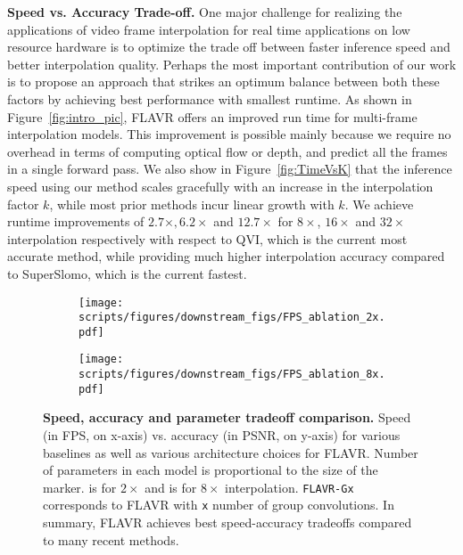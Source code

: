 \documentclass[10pt,twocolumn,letterpaper]{article}
\newcommand{\figref}[1]{Figure~\ref{#1}}
\newcommand{\red}[1]{{#1}}
\newcommand{\Ours}{FLAVR}
\newcommand{\twox}{$2\times$}
\newcommand{\eightx}{$8\times$}
\newcommand{\stimes}{{\times}}
\begin{document}
{\bf Speed vs. Accuracy Trade-off.}
One major challenge for realizing the applications of video frame interpolation for real time applications on low resource hardware is to optimize the trade off between faster inference speed and better interpolation quality. 
Perhaps the most important contribution of our work is to propose an approach that strikes an optimum balance between both these factors by achieving best performance with smallest runtime. \red{As shown in \figref{fig:intro_pic}, FLAVR offers an improved run time for multi-frame interpolation models.
This improvement is possible mainly because we require no overhead in terms of computing optical flow or depth, and predict all the frames in a single forward pass. We also show in \figref{fig:TimeVsK} that the inference speed using our method scales gracefully with an increase in the interpolation factor $k$, while most prior methods incur linear growth with $k$. We achieve runtime improvements of $2.7\stimes, 6.2\stimes$ and $12.7\stimes$ for \eightx{}, $16\stimes$ and $32\stimes$ interpolation respectively with respect to QVI, which is the current most accurate method, while providing much higher interpolation accuracy compared to SuperSlomo, which is the current fastest.} 



\begin{figure}[t]
     \centering
     \begin{subfigure}[t]{0.23\textwidth}
         \centering
         \texttt{[image: scripts/figures/downstream\_figs/FPS\_ablation\_2x.pdf]}
         \subcaption{\twox{} interpolation}
         \label{fig:tradeoff2x}
     \end{subfigure}
\begin{subfigure}[t]{0.23\textwidth}
         \centering
         \texttt{[image: scripts/figures/downstream\_figs/FPS\_ablation\_8x.pdf]}
         \subcaption{\eightx{} interpolation}
         \label{fig:tradeoff8x}
     \end{subfigure}
     \vspace{-8pt}
    \caption{{\bf Speed, accuracy and parameter tradeoff comparison.} Speed (in FPS, on x-axis) vs. accuracy (in PSNR, on y-axis) for various baselines as well as various architecture choices for \Ours{}. Number of parameters in each model is proportional to the size of the marker.  is for \twox{} and  is for \eightx{} interpolation. \texttt{FLAVR-Gx} corresponds to \Ours{} with \texttt{x} number of group convolutions. In summary, \Ours{} achieves best speed-accuracy tradeoffs compared to many recent methods.
    }
    \label{fig:SpeedVsAccuracy}
    \vspace{-16pt}
\end{figure}
%
 
\end{document}

